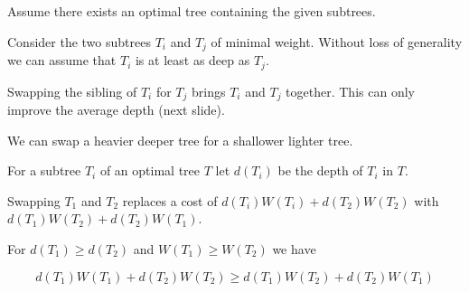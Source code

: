 Assume there exists an optimal tree containing the given subtrees.

\vfill
Consider the two subtrees $T_i$ and $T_j$ of minimal weight.  Without loss of generality we can assume that $T_i$ is at least as deep as $T_j$.

\vfill
Swapping the sibling of $T_i$ for $T_j$ brings $T_i$ and $T_j$ together.  This can only improve the average depth (next slide).


We can swap a heavier deeper tree for a shallower lighter tree.

\vfill
For a subtree $T_i$ of an optimal tree $T$ let $d(T_i)$ be the depth of $T_i$ in $T$.

Swapping $T_1$ and $T_2$ replaces a cost of $d(T_i)W(T_i) + d(T_2)W(T_2)$ with $d(T_1)W(T_2) + d(T_2)W(T_1)$.

\vfill
For $d(T_1) \geq d(T_2)$ and $W(T_1) \geq W(T_2)$ we have

\vfill
$$d(T_1)W(T_1) + d(T_2)W(T_2) \geq d(T_1)W(T_2) + d(T_2)W(T_1)$$




